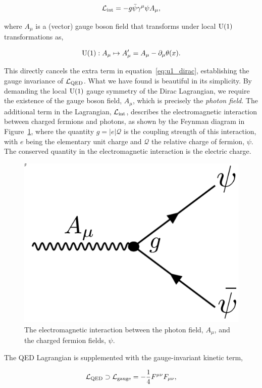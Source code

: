 \begin{equation}\label{eq:qed_interaction}
    \mathcal{L}_{\rm{int}} = -g\bar{\psi}\gamma^{\mu}{\psi}A_\mu,
\end{equation}

\noindent
where $A_\mu$ is a (vector) gauge boson field that transforms under local ${\rm{U}}(1)$ transformations as,

\begin{equation}
    {\rm{U}}(1): A_\mu \mapsto A_\mu' = A_\mu - {\partial_\mu\theta(x)}.
\end{equation}

\noindent
This directly cancels the extra term in equation~\ref{eq:u1_dirac}, establishing the gauge invariance of $\mathcal{L}_{\rm{QED}}$. What we have found is beautiful in its simplicity. By demanding the local ${\rm{U}}(1)$ gauge symmetry of the Dirac Lagrangian, we require the existence of the gauge boson field, $A_\mu$, which is precisely the \textit{photon field}. The additional term in the Lagrangian, $\mathcal{L}_{\rm{int}}$, describes the electromagnetic interaction between charged fermions and photons,
as shown by the Feynman diagram in Figure~\ref{fig:eminteraction}, where the quantity $g=|e|\mathcal{Q}$ is the coupling strength of this interaction, with $e$ being the elementary unit charge and $\mathcal{Q}$ the relative charge of fermion, $\psi$. The conserved quantity in the electromagnetic interaction is the electric charge.

\begin{figure}
  \centering
  \includegraphics[width=.25\linewidth]{Figures/theory/em_interaction.pdf}
  \caption[The electromagnetic interaction]
  {
    The electromagnetic interaction between the photon field, $A_\mu$, and the charged fermion fields, $\psi$.
  }
  \label{fig:eminteraction}
\end{figure}

The QED Lagrangian is supplemented with the gauge-invariant kinetic term, 

\begin{equation}
    \mathcal{L}_{\rm{QED}} \supset \mathcal{L}_{\rm{gauge}} = -\frac{1}{4}F^{\mu\nu}F_{\mu\nu},
\end{equation}

